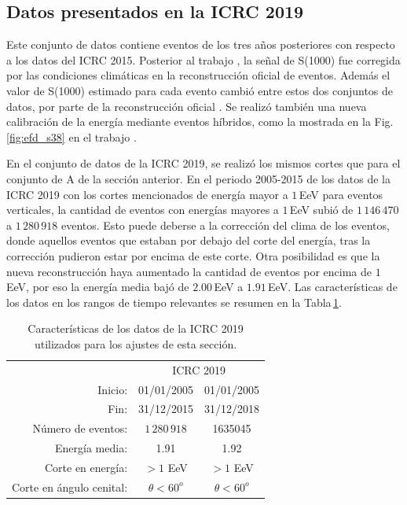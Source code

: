 \subsection{Datos presentados en la ICRC 2019}\label{conjuntoB}

Este conjunto de datos contiene eventos de los tres años posteriores con respecto  a los datos del ICRC 2015. Posterior al trabajo \cite{aab2017impact}, la señal de S(1000) fue corregida por las condiciones climáticas en la reconstrucción oficial de eventos. Además el valor de S(1000) estimado para cada evento cambió entre estos dos conjuntos de datos, por parte de la reconstrucción oficial \cite{isabel}. Se realizó también una nueva calibración de la energía mediante eventos híbridos, como la mostrada en la Fig.\,\ref{fig:efd_s38} en el trabajo  \cite{tobepublished}. 

En el conjunto de datos de la ICRC 2019, se realizó los mismos cortes que para el conjunto de A de la sección anterior. En el periodo 2005-2015 de los datos de la ICRC 2019 con los cortes mencionados de energía mayor a $1\,$EeV para eventos verticales, la cantidad de eventos con energías mayores a $1\,$EeV subió de $1\,146\,470$ a  $1\,280\,918$ eventos. Esto puede deberse a la corrección del clima de los eventos, donde aquellos eventos que estaban por debajo del corte del energía, tras la corrección pudieron estar por encima de este corte. Otra posibilidad es que la nueva reconstrucción haya aumentado la cantidad de eventos por encima de $1\,$EeV, por eso la energía media bajó de $2.00\,$EeV a $1.91\,$EeV.  Las características de los datos en los rangos de tiempo relevantes se resumen en la Tabla\,\ref{tabla:caracteristicas_ICRC_2019}. 

   \begin{table}[H]
       \centering
       \begin{tabular}{r|c|c|}
    \cline{2-3}
                              & \multicolumn{2}{c|}{ICRC 2019} \\ \cline{2-3}
         Inicio:              & 01/01/2005      & 01/01/2005\\
         Fin:                 & 31/12/2015      & 31/12/2018\\  
         Número de eventos:   &  $1\,280\,918$     			    &  1635045     		        \\ 
         Energía media:       &  1.91				        &	1.92				        \\ 
         Corte en energía:    &  $>1$ EeV       		 	    &  $>1$  EeV       		 \\ 
         Corte en ángulo cenital:	&  $\theta<60^o$ 				    & $\theta < 60^o$\\ \cline{2-3}
       \end{tabular}
       \caption{Características de los datos de la ICRC 2019 utilizados para los ajustes de esta sección.} \label{tabla:caracteristicas_ICRC_2019}
   \end{table}


